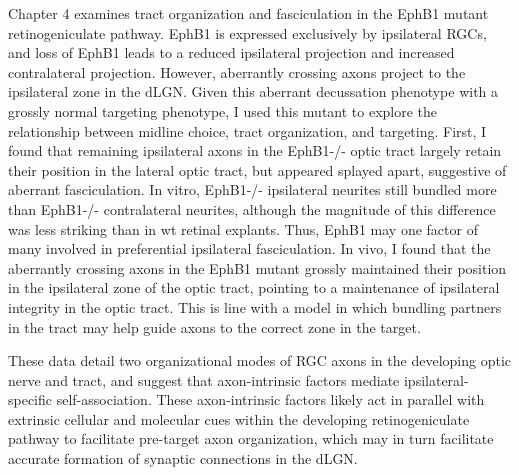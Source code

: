 Chapter 4 examines tract organization and fasciculation in the EphB1 mutant retinogeniculate pathway.
EphB1 is expressed exclusively by ipsilateral RGCs, and loss of EphB1 leads to a reduced ipsilateral projection and increased contralateral projection.
However, aberrantly crossing axons project to the ipsilateral zone in the dLGN.
Given this aberrant decussation phenotype with a grossly normal targeting phenotype, I used this mutant to explore the relationship between midline choice, tract organization, and targeting.
First, I found that remaining ipsilateral axons in the EphB1-/- optic tract largely retain their position in the lateral optic tract, but appeared splayed apart, suggestive of aberrant fasciculation.
In vitro, EphB1-/- ipsilateral neurites still bundled more than EphB1-/- contralateral neurites, although the magnitude of this difference was less striking than in wt retinal explants.
Thus, EphB1 may one factor of many involved in preferential ipsilateral fasciculation.
In vivo, I found that the aberrantly crossing axons in the EphB1 mutant grossly maintained their position in the ipsilateral zone of the optic tract, pointing to a maintenance of ipsilateral integrity in the optic tract.
This is line with a model in which bundling partners in the tract may help guide axons to the correct zone in the target.

These data detail two organizational modes of RGC axons in the developing optic nerve and tract, and suggest that axon-intrinsic factors mediate ipsilateral-specific self-association.
These axon-intrinsic factors likely act in parallel with extrinsic cellular and molecular cues within the developing retinogeniculate pathway to facilitate pre-target axon organization, which may in turn facilitate accurate formation of synaptic connections in the dLGN.